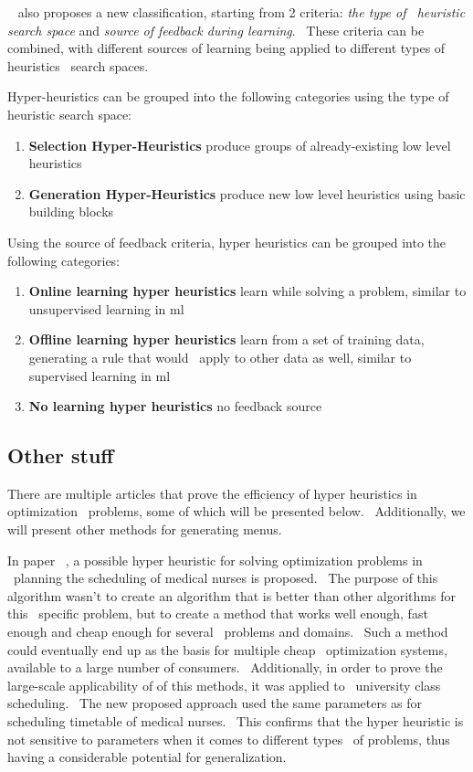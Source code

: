 ~\cite{MetaHeuristicsHandbook} also proposes a new classification, starting from 2 criteria: \textit{the type of \
heuristic search space} and \textit{source of feedback during learning}. \
These criteria can be combined, with different sources of learning being applied to different types of heuristics \
search spaces.

Hyper-heuristics can be grouped into the following categories using the type of heuristic search space:
\begin{enumerate}
    \item \textbf{Selection Hyper-Heuristics} produce groups of already-existing low level heuristics
    \item \textbf{Generation Hyper-Heuristics} produce new low level heuristics using basic building blocks
\end{enumerate}

Using the source of feedback criteria, hyper heuristics can be grouped into the following categories:
\begin{enumerate}
    \item \textbf{Online learning hyper heuristics} learn while solving a problem, similar to unsupervised learning in ml
    \item \textbf{Offline learning hyper heuristics} learn from a set of training data, generating a rule that would \
    apply to other data as well, similar to supervised learning in ml
    \item \textbf{No learning hyper heuristics} no feedback source
\end{enumerate}


\subsection{Other stuff}
\label{subsec:research-other-stuff}

There are multiple articles that prove the efficiency of hyper heuristics in optimization \
problems, some of which will be presented below. \
Additionally, we will present other methods for generating menus.

In paper ~\cite{ekburke}, a possible hyper heuristic for solving optimization problems in \
planning the scheduling of medical nurses is proposed. \
The purpose of this algorithm wasn't to create an algorithm that is better than other algorithms for this \
specific problem, but to create a method that works well enough, fast enough  and cheap enough for several \
problems and domains. \
Such a method could eventually end up as the basis for multiple cheap \
optimization systems, available to a large number of consumers. \
Additionally, in order to prove the large-scale applicability of of this methods, it was applied to \
university class scheduling. \
The new proposed approach used the same parameters as for scheduling timetable of medical nurses. \
This confirms that the hyper heuristic is not sensitive to parameters when it comes to different types \
of problems, thus having a considerable potential for generalization.




